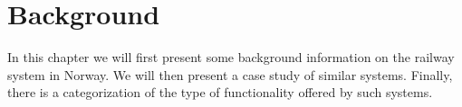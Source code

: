 
\chapter{Background}
\label{chapter:background}

In this chapter we will first present some background information on the 
railway system in Norway. We will then present a case study of similar systems.
Finally, there is a categorization of the type of functionality offered by 
such systems.





